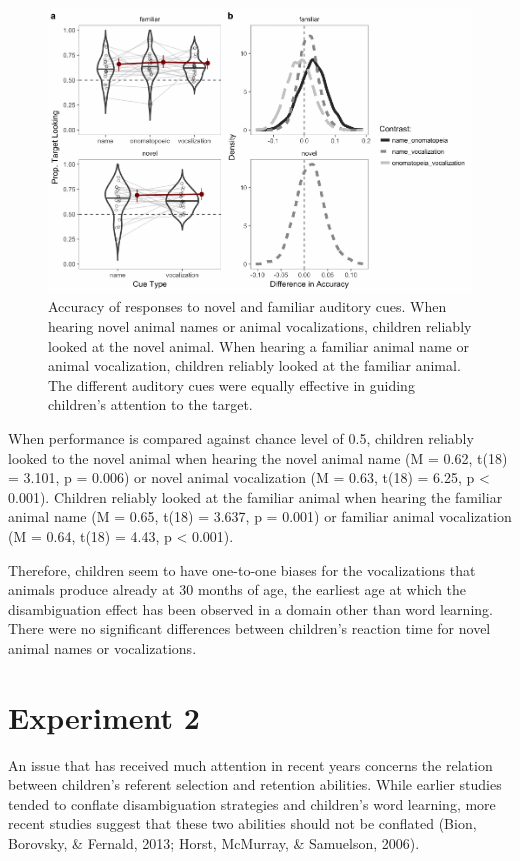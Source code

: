 \documentclass[english,floatsintext,man]{apa6}
\theoremstyle{definition}
\theoremstyle{definition}
\theoremstyle{definition}
\theoremstyle{remark}
\begin{document}
\begin{figure}
\centering
\includegraphics{anime_manuscript_files/figure-latex/acc-plot-e1-1.pdf}
\caption{\label{fig:acc-plot-e1}Accuracy of responses to novel and familiar
auditory cues. When hearing novel animal names or animal vocalizations,
children reliably looked at the novel animal. When hearing a familiar
animal name or animal vocalization, children reliably looked at the
familiar animal. The different auditory cues were equally effective in
guiding children's attention to the target.}
\end{figure}

When performance is compared against chance level of 0.5, children
reliably looked to the novel animal when hearing the novel animal name
(M = 0.62, t(18) = 3.101, p = 0.006) or novel animal vocalization (M =
0.63, t(18) = 6.25, p \textless{} 0.001). Children reliably looked at
the familiar animal when hearing the familiar animal name (M = 0.65,
t(18) = 3.637, p = 0.001) or familiar animal vocalization (M = 0.64,
t(18) = 4.43, p \textless{} 0.001).

Therefore, children seem to have one-to-one biases for the vocalizations
that animals produce already at 30 months of age, the earliest age at
which the disambiguation effect has been observed in a domain other than
word learning. There were no significant differences between children's
reaction time for novel animal names or vocalizations.

\section{Experiment 2}\label{experiment-2}

An issue that has received much attention in recent years concerns the
relation between children's referent selection and retention abilities.
While earlier studies tended to conflate disambiguation strategies and
children's word learning, more recent studies suggest that these two
abilities should not be conflated (Bion, Borovsky, \& Fernald, 2013;
Horst, McMurray, \& Samuelson, 2006).
\end{document}
